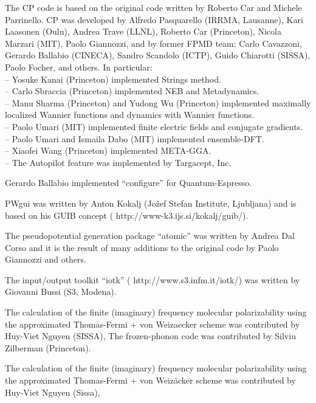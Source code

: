 \documentclass[12pt,a4paper]{article}
\begin{document}
The CP code is based on the original code written by Roberto Car and 
Michele Parrinello. CP was developed by Alfredo Pasquarello (IRRMA, 
Lausanne), Kari Laasonen (Oulu), Andrea Trave (LLNL), Roberto Car 
(Princeton), Nicola Marzari (MIT), Paolo Giannozzi, and by former 
FPMD team: Carlo Cavazzoni, Gerardo Ballabio (CINECA), Sandro Scandolo 
(ICTP), Guido Chiarotti (SISSA), Paolo Focher, and others.
In particular:\\
-- Yosuke Kanai (Princeton) implemented Strings method.\\
-- Carlo Sbraccia (Princeton) implemented NEB and Metadynamics.\\
-- Manu Sharma (Princeton) and Yudong Wu (Princeton) implemented
maximally localized Wannier functions and dynamics with Wannier functions.\\
-- Paolo Umari (MIT) implemented finite electric fields and conjugate 
gradients.\\
-- Paolo Umari and Ismaila Dabo (MIT) implemented ensemble-DFT.\\
-- Xiaofei Wang (Princeton) implemented META-GGA.\\
-- The Autopilot feature was implemented by Targacept, Inc.

Gerardo Ballabio implemented ``configure'' for Quantum-Espresso.

PWgui was written by Anton Kokalj (Jo\v{z}ef Stefan Institute, Ljubljana)
and is based on his GUIB concept
(%
                   {http://www-k3.ijs.si/kokalj/guib/}).

The pseudopotential generation package ``atomic'' was written by
Andrea Dal Corso and it is the result of many additions to the
original code by Paolo Giannozzi and others.

The input/output toolkit ``iotk''
(%
                   {http://www.s3.infm.it/iotk/}) 
was written by Giovanni Bussi (S3, Modena).

The calculation of the finite (imaginary) frequency molecular 
polarizability using the approximated Thomas-Fermi  + von Weizaecker
scheme was contributed by Huy-Viet Nguyen (SISSA),
The frozen-phonon code was contributed by Silviu Zilberman
(Princeton).

The calculation of the finite (imaginary) frequency molecular 
polarizability using the approximated Thomas-Fermi  + von Weiz\"acker
scheme was contributed by Huy-Viet Nguyen (Sissa),
\end{document}
